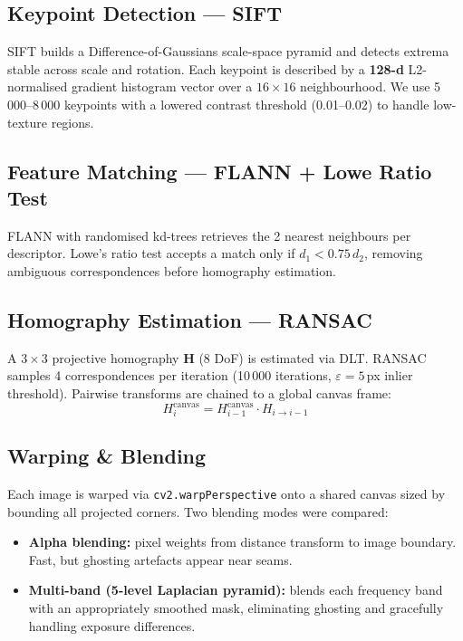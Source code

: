 \documentclass[11pt,a4paper]{article}
\begin{document}
\subsection{Keypoint Detection --- SIFT}
SIFT builds a Difference-of-Gaussians scale-space pyramid and detects extrema stable across scale and rotation. Each keypoint is described by a \textbf{128-d} L2-normalised gradient histogram vector over a $16{\times}16$ neighbourhood. We use 5\,000--8\,000 keypoints with a lowered contrast threshold (0.01--0.02) to handle low-texture regions.

\subsection{Feature Matching --- FLANN + Lowe Ratio Test}
FLANN with randomised kd-trees retrieves the 2 nearest neighbours per descriptor. Lowe's ratio test accepts a match only if $d_1 < 0.75\,d_2$, removing ambiguous correspondences before homography estimation.

\subsection{Homography Estimation --- RANSAC}
A $3{\times}3$ projective homography $\mathbf{H}$ (8 DoF) is estimated via DLT. RANSAC samples 4 correspondences per iteration (10\,000 iterations, $\varepsilon = 5$\,px inlier threshold). Pairwise transforms are chained to a global canvas frame:
\[
H_i^{\text{canvas}} = H_{i-1}^{\text{canvas}} \cdot H_{i \to i-1}
\]

\subsection{Warping \& Blending}
Each image is warped via \texttt{cv2.warpPerspective} onto a shared canvas sized by bounding all projected corners. Two blending modes were compared:
\begin{itemize}[noitemsep, topsep=2pt]
    \item \textbf{Alpha blending:} pixel weights from distance transform to image boundary. Fast, but ghosting artefacts appear near seams.
    \item \textbf{Multi-band (5-level Laplacian pyramid):} blends each frequency band with an appropriately smoothed mask, eliminating ghosting and gracefully handling exposure differences.
\end{itemize}

\end{document}
